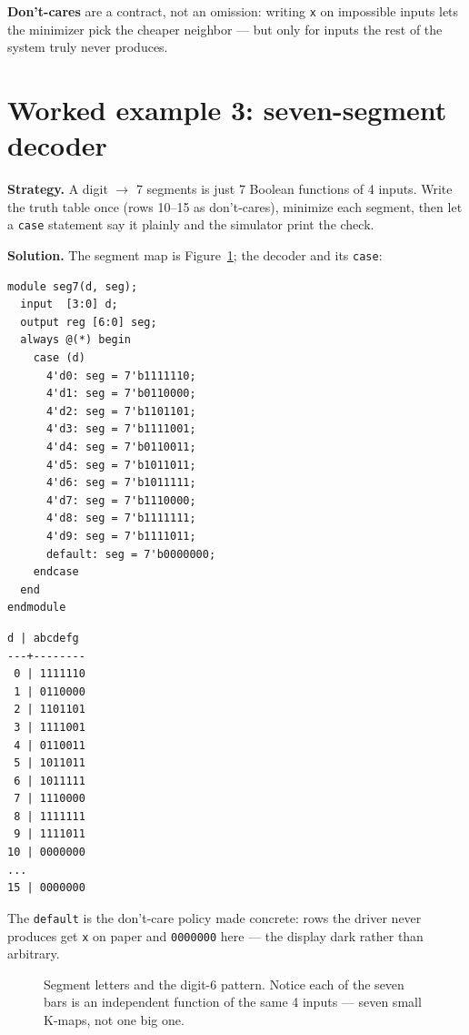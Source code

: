 \textbf{Don't-cares} are a contract, not an omission:
writing \texttt{x} on impossible inputs lets the minimizer pick the
cheaper neighbor — but only for inputs the rest of the system truly
never produces.

\section{Worked example 3: seven-segment decoder}
\label{sec:we-seg7}

\textbf{Strategy.} A digit $\to$ 7 segments is just 7 Boolean functions
of 4 inputs. Write the truth table once (rows 10--15 as don't-cares),
minimize each segment, then let a \texttt{case} statement say it plainly
and the simulator print the check.

\textbf{Solution.} The segment map is Figure~\ref{fig:seg7map}; the
decoder and its \texttt{case}:

\begin{lstlisting}[caption={\ttfamily code/ch09\_seg7.v --- BCD to
cathodes \texttt{\{a,b,c,d,e,f,g\}}.},label={lst:seg7},abovecaptionskip=0pt]
module seg7(d, seg);
  input  [3:0] d;
  output reg [6:0] seg;
  always @(*) begin
    case (d)
      4'd0: seg = 7'b1111110;
      4'd1: seg = 7'b0110000;
      4'd2: seg = 7'b1101101;
      4'd3: seg = 7'b1111001;
      4'd4: seg = 7'b0110011;
      4'd5: seg = 7'b1011011;
      4'd6: seg = 7'b1011111;
      4'd7: seg = 7'b1110000;
      4'd8: seg = 7'b1111111;
      4'd9: seg = 7'b1111011;
      default: seg = 7'b0000000;
    endcase
  end
endmodule
\end{lstlisting}

\begin{lstlisting}[caption={Real truth-dump of
\texttt{ch09\_seg7\_tb.v} --- digits 0--9 plus the don't-care rows.},abovecaptionskip=0pt]
 d | abcdefg
---+--------
 0 | 1111110
 1 | 0110000
 2 | 1101101
 3 | 1111001
 4 | 0110011
 5 | 1011011
 6 | 1011111
 7 | 1110000
 8 | 1111111
 9 | 1111011
10 | 0000000
...
15 | 0000000
\end{lstlisting}

The \texttt{default} is the don't-care policy made concrete: rows the
driver never produces get \texttt{x} on paper and \texttt{0000000} here —
the display dark rather than arbitrary.

\begin{figure}[htbp]
\centering

\caption{Segment letters and the digit-6 pattern. Notice each of the
seven bars is an independent function of the same 4 inputs — seven small
K-maps, not one big one.}
\label{fig:seg7map}
\end{figure}

